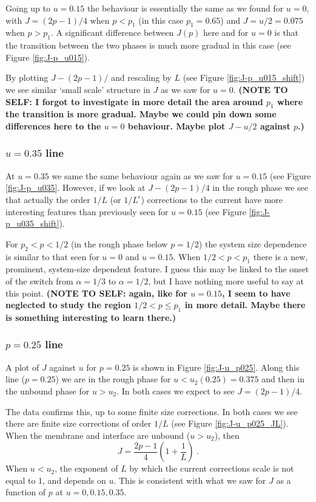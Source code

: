 \documentclass[a4paper,10pt]{article}
\newcommand{\fref}[1]{Figure \ref{#1}}
\begin{document}
Going up to $u=0.15$ the behaviour is essentially the same as we found for $u=0$, with $J = (2p-1)/4$ when $p < p_1$ (in this case $p_1 = 0.65$) and $J = u/2 = 0.075$ when $p>p_1$. A significant difference between $J(p)$ here and for $u=0$ is that the transition between the two phases is much more gradual in this case (see \fref{fig:J-p_u015}).

By plotting $J-(2p-1)/$ and rescaling by $L$ (see \fref{fig:J-p_u015_shift}) we see similar `small scale' structure in $J$ as we saw for $u=0$. {\bf (NOTE TO SELF: I forgot to investigate in more detail the area around $p_1$ where the transition is more gradual. Maybe we could pin down some differences here to the $u=0$ behaviour. Maybe plot $J-u/2$ against $p$.)}

\subsubsection{$u=0.35$ line}

At $u = 0.35$ we same the same behaviour again as we saw for $u = 0.15$ (see \fref{fig:J-p_u035}. However, if we look at $J -(2p-1)/4$ in the rough phase we see that actually the order $1/L$ (or $1/L^\epsilon$) corrections to the current have more interesting features than previously seen for $u = 0.15$ (see \fref{fig:J-p_u035_shift}). 

For $p_2 < p < 1/2$ (in the rough phase below $p=1/2$) the system size dependence is similar to that seen for $u = 0$ and $u = 0.15$. When $1/2 < p < p_1$ there is a new, prominent, system-size dependent feature. I guess this may be linked to the onset of the switch from $\alpha = 1/3$ to $\alpha = 1/2$, but I have nothing more useful to say at this point. {\bf (NOTE TO SELF: again, like for $u=0.15$, I seem to have neglected to study the region $1/2 < p \le p_1$ in more detail. Maybe there is something interesting to learn there.)}

\subsubsection{$p=0.25$ line}

A plot of $J$ against $u$ for $p = 0.25$ is shown in \fref{fig:J-u_p025}. Along this line ($p=0.25$) we are in the rough phase for $u < u_2(0.25) = 0.375$ and then in the unbound phase for $u > u_2$. In both cases we expect to see $J = (2p-1)/4$.

The data confirms this, up to some finite size corrections. In both cases we see there are finite size corrections of order $1/L$ (see \fref{fig:J-u_p025_JL}). When the membrane and interface are unbound ($u > u_2$), then
\begin{equation}
 J = \frac{2p-1}{4} \left( 1 + \frac{1}{L} \right) \;.
\end{equation}
When $u < u_2$, the exponent of $L$ by which the current corrections scale is not equal to 1, and depends on $u$. This is consistent with what we saw for $J$ as a function of $p$ at $u = 0, 0.15, 0.35$.
\end{document}
